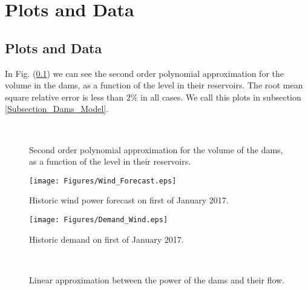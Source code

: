 
%
\chapter*{\thechapter \quad Plots and Data}
\label{appendixC}

\section{Plots and Data}

In Fig. (\ref{Plot_AppC_1}) we can see the second order polynomial approximation for the volume in the dams, as a function of the level in their reservoirs. The root mean square relative error is less than $2 \%$ in all cases. We call this plots in subsection \ref{Subsection_Dams_Model}.

\begin{figure}[!ht]
\centering
{}\\
\qquad
{}
\caption{Second order polynomial approximation for the volume of the dams, as a function of the level in their reservoirs.}
\label{Plot_AppC_1}
\end{figure}

\begin{figure}[!ht]
\centering
\texttt{[image: Figures/Wind\_Forecast.eps]}
\caption{Historic wind power forecast on first of January 2017.}
\label{Wind_Forecast}
\end{figure}
\begin{figure}[!ht]
\centering
\texttt{[image: Figures/Demand\_Wind.eps]}
\caption{Historic demand on first of January 2017.}
\label{Demand_Wind}
\end{figure}

\begin{figure}[!ht]
\centering
{}\\
\qquad
{}
\caption{Linear approximation between the power of the dams and their flow.}
\label{Plot_AppC_2}
\end{figure}

